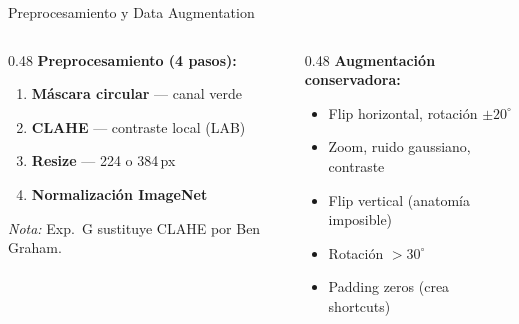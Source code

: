\documentclass[aspectratio=169, 11pt]{beamer}
\begin{document}
\begin{frame}{Preprocesamiento y Data Augmentation}

  \begin{columns}[T]
    \begin{column}{0.48\textwidth}
      \textbf{Preprocesamiento (4 pasos):}
      \begin{enumerate}
        \item \textbf{Máscara circular} --- canal verde
        \item \textbf{CLAHE} --- contraste local (LAB)
        \item \textbf{Resize} --- 224 o 384\,px
        \item \textbf{Normalización ImageNet}
      \end{enumerate}
      \vspace{4pt}
      {\small\textit{Nota:} Exp.~G sustituye CLAHE por Ben Graham.}
    \end{column}
    \begin{column}{0.48\textwidth}
      \textbf{Augmentación conservadora:}
      \begin{itemize}
        \item[\textcolor{verdeok}{\checkmark}] Flip horizontal, rotación $\pm 20^\circ$
        \item[\textcolor{verdeok}{\checkmark}] Zoom, ruido gaussiano, contraste
        \item[\textcolor{rojoko}{$\times$}] Flip vertical (anatomía imposible)
        \item[\textcolor{rojoko}{$\times$}] Rotación $>30^\circ$
        \item[\textcolor{rojoko}{$\times$}] Padding zeros (crea shortcuts)
      \end{itemize}
    \end{column}
  \end{columns}
\end{frame}
\end{document}
